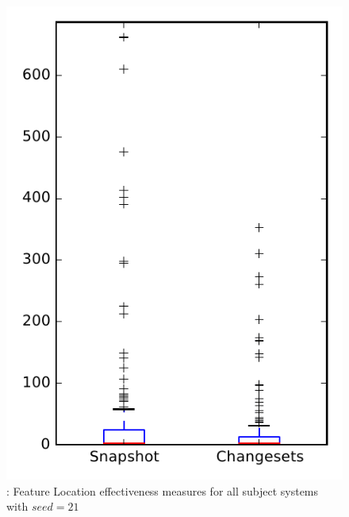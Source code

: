 
\begin{figure}
\centering
\includegraphics[height=0.4\textheight]{figures/flt_seed/rq1_overview_21}
\caption{\rone: Feature Location effectiveness measures for all subject systems with $seed=21$}
\label{fig:flt_seed:rq1:overview}
\end{figure}

